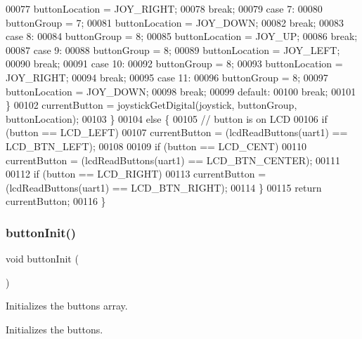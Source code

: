 \begin{DoxyCode}
00077             buttonLocation = JOY\_RIGHT;
00078             \textcolor{keywordflow}{break};
00079         \textcolor{keywordflow}{case} 7:
00080             buttonGroup = 7;
00081             buttonLocation = JOY\_DOWN;
00082             \textcolor{keywordflow}{break};
00083         \textcolor{keywordflow}{case} 8:
00084             buttonGroup = 8;
00085             buttonLocation = JOY\_UP;
00086             \textcolor{keywordflow}{break};
00087         \textcolor{keywordflow}{case} 9:
00088             buttonGroup = 8;
00089             buttonLocation = JOY\_LEFT;
00090             \textcolor{keywordflow}{break};
00091         \textcolor{keywordflow}{case} 10:
00092             buttonGroup = 8;
00093             buttonLocation = JOY\_RIGHT;
00094             \textcolor{keywordflow}{break};
00095         \textcolor{keywordflow}{case} 11:
00096             buttonGroup = 8;
00097             buttonLocation = JOY\_DOWN;
00098             \textcolor{keywordflow}{break};
00099         \textcolor{keywordflow}{default}:
00100             \textcolor{keywordflow}{break};
00101         \}
00102         currentButton = joystickGetDigital(joystick, buttonGroup, buttonLocation);
00103     \}
00104     \textcolor{keywordflow}{else} \{
00105         \textcolor{comment}{// button is on LCD}
00106         \textcolor{keywordflow}{if} (button == LCD_LEFT)
00107             currentButton = (lcdReadButtons(uart1) == LCD\_BTN\_LEFT);
00108 
00109         \textcolor{keywordflow}{if} (button == LCD_CENT)
00110             currentButton = (lcdReadButtons(uart1) == LCD\_BTN\_CENTER);
00111 
00112         \textcolor{keywordflow}{if} (button == LCD_RIGHT)
00113             currentButton = (lcdReadButtons(uart1) == LCD\_BTN\_RIGHT);
00114     \}
00115     \textcolor{keywordflow}{return} currentButton;
00116 \}
\end{DoxyCode}
\mbox{\label{toggle_8c_a2b3d226371575c894979ab84bce95626}} 
\subsubsection{button\+Init()}
{\footnotesize\ttfamily void button\+Init (\begin{DoxyParamCaption}{ }\end{DoxyParamCaption})}



Initializes the buttons array. 

Initializes the buttons. 


